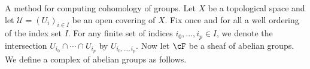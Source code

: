 A method for computing cohomology of groups. Let $X$ be a topological space and let $\mathcal{U}= (U_i)_{i \in I}$ be an open covering of $X$. Fix once and for all a well ordering of the index set $I$. For any finite set of indices $i_0,\ldots,i_p \in I$, we denote the intersection $U_{i_0} \cap \cdots \cap U_{i_p}$ by $U_{i_0,\ldots,i_p}$. Now let $\cF$ be a sheaf of abelian groups. We define a complex of abelian groups as follows. 

































